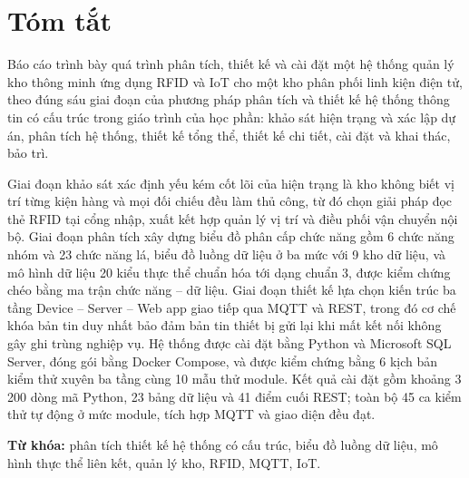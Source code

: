 \chapter*{Tóm tắt}

Báo cáo trình bày quá trình phân tích, thiết kế và cài đặt một hệ thống quản lý kho thông minh ứng dụng RFID và IoT cho một kho phân phối linh kiện điện tử, theo đúng sáu giai đoạn của phương pháp phân tích và thiết kế hệ thống thông tin có cấu trúc trong giáo trình của học phần: khảo sát hiện trạng và xác lập dự án, phân tích hệ thống, thiết kế tổng thể, thiết kế chi tiết, cài đặt và khai thác, bảo trì.

Giai đoạn khảo sát xác định yếu kém cốt lõi của hiện trạng là kho không biết vị trí từng kiện hàng và mọi đối chiếu đều làm thủ công, từ đó chọn giải pháp đọc thẻ RFID tại cổng nhập, xuất kết hợp quản lý vị trí và điều phối vận chuyển nội bộ. Giai đoạn phân tích xây dựng biểu đồ phân cấp chức năng gồm 6 chức năng nhóm và 23 chức năng lá, biểu đồ luồng dữ liệu ở ba mức với 9 kho dữ liệu, và mô hình dữ liệu 20 kiểu thực thể chuẩn hóa tới dạng chuẩn 3, được kiểm chứng chéo bằng ma trận chức năng -- dữ liệu. Giai đoạn thiết kế lựa chọn kiến trúc ba tầng Device -- Server -- Web app giao tiếp qua MQTT và REST, trong đó cơ chế khóa bản tin duy nhất bảo đảm bản tin thiết bị gửi lại khi mất kết nối không gây ghi trùng nghiệp vụ. Hệ thống được cài đặt bằng Python và Microsoft SQL Server, đóng gói bằng Docker Compose, và được kiểm chứng bằng 6 kịch bản kiểm thử xuyên ba tầng cùng 10 mẫu thử module. Kết quả cài đặt gồm khoảng 3\,200 dòng mã Python, 23 bảng dữ liệu và 41 điểm cuối REST; toàn bộ 45 ca kiểm thử tự động ở mức module, tích hợp MQTT và giao diện đều đạt.

\medskip
\noindent\textbf{Từ khóa:} phân tích thiết kế hệ thống có cấu trúc, biểu đồ luồng dữ liệu, mô hình thực thể liên kết, quản lý kho, RFID, MQTT, IoT.
